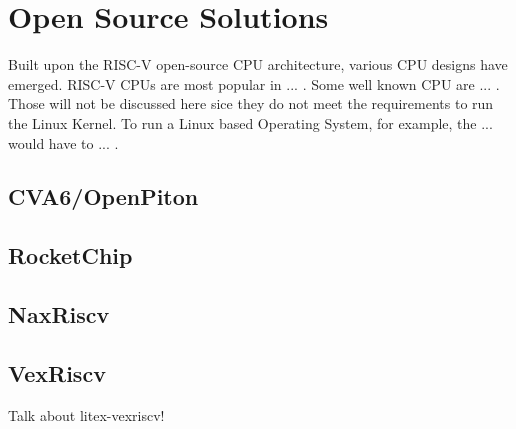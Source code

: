 \section{Open Source Solutions}
Built upon the RISC-V open-source CPU architecture, various CPU designs have emerged. RISC-V CPUs are most popular in ... . Some well known CPU are ... . Those will not be discussed here sice they do not meet the requirements to run the Linux Kernel. To run a Linux based Operating System, for example, the ... would have to ... .

\subsection{CVA6/OpenPiton}
\subsection{RocketChip}
\subsection{NaxRiscv}
\subsection{VexRiscv}

Talk about litex-vexriscv!